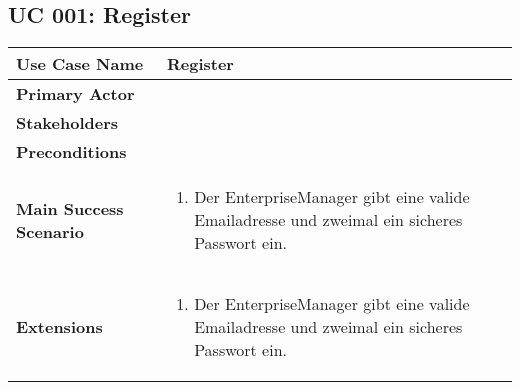\subsection{UC 001: Register}
\label{uc:001-register}
\begin{tabular}{|l|p{}|}
\hline
\textbf{Use Case Name} 	&	Register	\\ \hline
\textbf{Primary Actor} 	&		\\ \hline
\textbf{Stakeholders}	&		\\ \hline
\textbf{Preconditions}	&		\\ \hline
\textbf{Main Success Scenario}	& 	
\begin{enumerate}
	\item Der EnterpriseManager gibt eine valide Emailadresse und zweimal ein sicheres Passwort ein.
\end{enumerate}
\\ \hline
\textbf{Extensions}	& 	
\begin{enumerate}
	\item Der EnterpriseManager gibt eine valide Emailadresse und zweimal ein sicheres Passwort ein.
\end{enumerate}
\\ \hline
\end{tabular}